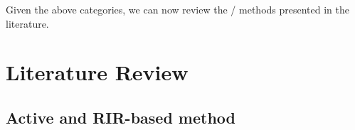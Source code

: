 \mynewline
Given the above categories, we can now review the \AER/ methods presented in the literature.

\section{Literature Review}\label{sec:estimation:sota}

\subsection{Active and RIR-based method}\label{subsec:estimation:active_rir}

